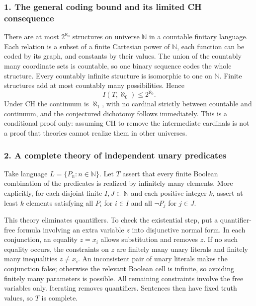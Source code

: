 \documentclass[11pt]{article}
\begin{document}
\subsubsection{1. The general coding bound and its limited CH consequence}
There are at most $2^{\aleph_0}$ structures on universe $\mathbb N$ in a countable finitary language. Each relation is a subset of a finite Cartesian power of $\mathbb N$, each function can be coded by its graph, and constants by their values. The union of the countably many coordinate sets is countable, so one binary sequence codes the whole structure. Every countably infinite structure is isomorphic to one on $\mathbb N$. Finite structures add at most countably many possibilities. Hence
\[I(T,\aleph_0)\leq2^{\aleph_0}.\]
Under CH the continuum is $\aleph_1$, with no cardinal strictly between countable and continuum, and the conjectured dichotomy follows immediately. This is a conditional proof only: assuming CH to remove the intermediate cardinals is not a proof that theories cannot realize them in other universes.

\subsubsection{2. A complete theory of independent unary predicates}
Take language $L=\{P_n:n\in\mathbb N\}$. Let $T$ assert that every finite Boolean combination of the predicates is realized by infinitely many elements. More explicitly, for each disjoint finite $I,J\subset\mathbb N$ and each positive integer $k$, assert at least $k$ elements satisfying all $P_i$ for $i\in I$ and all $\neg P_j$ for $j\in J$.

This theory eliminates quantifiers. To check the existential step, put a quantifier-free formula involving an extra variable $z$ into disjunctive normal form. In each conjunction, an equality $z=x_i$ allows substitution and removes $z$. If no such equality occurs, the constraints on $z$ are finitely many unary literals and finitely many inequalities $z\ne x_i$. An inconsistent pair of unary literals makes the conjunction false; otherwise the relevant Boolean cell is infinite, so avoiding finitely many parameters is possible. All remaining constraints involve the free variables only. Iterating removes quantifiers. Sentences then have fixed truth values, so $T$ is complete.
\end{document}
